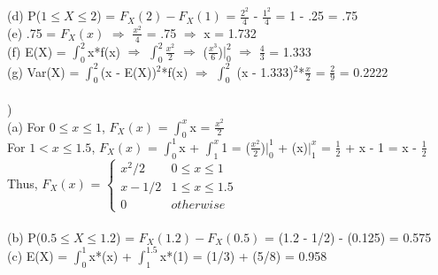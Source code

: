 \documentclass[12pt]{article}
\begin{document}
\indent (d) P($1 \leq X \leq 2$) = $F_X(2) - F_X(1)$ = {\Large $\frac{2^2}{4}$} - {\Large $\frac{1^2}{4}$} = 1 - .25 = .75\\

\indent (e) .75 = $F_X(x)$ $\Rightarrow$ {\Large $\frac{x^2}{4}$} = .75 $\Rightarrow$ x = 1.732\\

\indent (f) E(X) =  {\large$\int_{0}^{2}$}x*f(x) $\Rightarrow$ {\large$\int_{0}^{2}$}{\Large $\frac{x^2}{2}$} $\Rightarrow$ ({\Large $\frac{x^3}{6}$})$\Big|_{0}^{2}$ $\Rightarrow$ {\Large $\frac{4}{3}$} = 1.333\\

\indent (g) Var(X) = {\large$\int_{0}^{2}$}(x - E(X))$^2$*f(x) $\Rightarrow$ {\large$\int_{0}^{2}$} (x - 1.333)$^2$*{\Large $\frac{x}{2}$} = {\Large $\frac{2}{9}$} = 0.2222\\


\noindent \hrulefill \\[-.7em]


)\\
\indent (a) For $0 \leq x \leq 1$, $F_X(x)$ = {\large$\int_{0}^{x}$}x = {\Large $\frac{x^2}{2}$}\\
\indent \indent For $1 < x \leq 1.5$, $F_X(x)$ = {\large$\int_{0}^{1}$}x + {\large$\int_{1}^{x}$}1 = ({\Large $\frac{x^2}{2}$})$\Big|_{0}^{1}$ + (x)$\Big|_{1}^{x}$ = {\Large $\frac{1}{2}$} + x - 1 = x - {\Large $\frac{1}{2}$}\\


\indent\indent Thus, $F_X(x)$ = 
$
\begin{cases} 
	x^2/2 & 0 \leq x \leq 1 \\
	x - 1/2 & 1 \leq x \leq 1.5 \\
	0 & otherwise 
\end{cases}
$\\\\

\indent (b) P($0.5 \leq X \leq 1.2$) = $F_X(1.2) - F_X(0.5)$ = (1.2 - 1/2) - (0.125) = 0.575\\

\indent (c) E(X) =  {\large$\int_{0}^{1}$}x*(x) + {\large$\int_{1}^{1.5}$}x*(1) = (1/3) + (5/8) = 0.958
\end{document}
